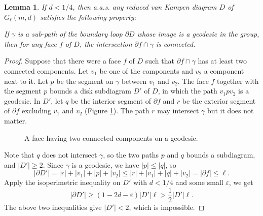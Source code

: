 \documentclass[a4paper]{article}
\newtheorem{lem}[thm]{Lemma}
\theoremstyle{remark}
\begin{document}
\begin{lem}\quad\label{connected on boundary}
    If $d<1/4$, then a.a.s. any reduced van Kampen diagram $D$ of $G_\ell(m,d)$ satisfies the following property:
    
    If $\gamma$ is a sub-path of the boundary loop $\partial D$ whose image is a geodesic in the group, then for any face $f$ of $D$, the intersection $\partial f\cap \gamma$ is connected.
\end{lem}
\begin{proof}
    Suppose that there were a face $f$ of $D$ such that $\partial f \cap \gamma$ has at least two connected components. Let $v_1$ be one of the components and $v_2$ a component next to it. Let $p$ be the segment on $\gamma$ between $v_1$ and $v_2$. The face $f$ together with the segment $p$ bounds a disk subdiagram $D'$ of $D$, in which the path $v_1pv_2$ is a geodesic. In $D'$, let $q$ be the interior segment of $\partial f$ and $r$ be the exterior segment of $\partial f$ excluding $v_1$ and $v_2$ (Figure \ref{figure not connected boundary}). The path $r$ may intersect $\gamma$ but it does not matter.
\begin{figure}[h]
\begin{center}
\end{center}
    \caption{A face having two connected components on a geodesic.}
    \label{figure not connected boundary}
\end{figure}

    Note that $q$ does not intersect $\gamma$, so the two paths $p$ and $q$ bounds a subdiagram, and $|D'|\geq 2$. Since $\gamma$ is a geodesic, we have $|p|\leq |q|$, so \[|\partial D'| = |r|+|v_1|+|p|+|v_2| \leq |r|+|v_1|+|q|+|v_2| =  |\partial f|\leq \ell.\] Apply the isoperimetric inequality on $D'$ with $d<1/4$ and some small $\varepsilon$, we get
    \[|\partial D'| \geq (1-2d-\varepsilon)|D'|\ell > \frac{1}{2}|D'|\ell.\]
    The above two inequalities give $|D'|<2$, which is impossible.
\end{proof}
\end{document}
